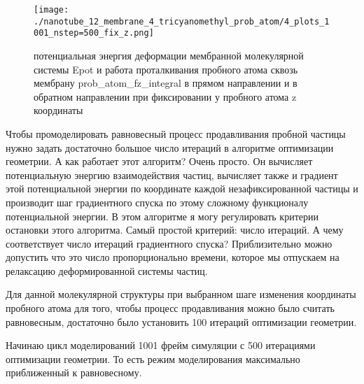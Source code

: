 \documentclass[12pt]{article}
\begin{document}
%



\begin{wrapfigure}{R}{0.7\textwidth}
    \centering
    \texttt{[image: ./nanotube\_12\_membrane\_4\_tricyanomethyl\_prob\_atom/4\_plots\_1001\_nstep=500\_fix\_z.png]}
    \caption{потенциальная энергия деформации мембранной молекулярной системы Epot и работа проталкивания пробного атома сквозь мембрану prob\_atom\_fz\_integral в прямом направлении и в обратном направлении при фиксировании у пробного атома z координаты}
    \label{fig:frame_center}
\end{wrapfigure}



Чтобы промоделировать равновесный процесс продавливания пробной частицы нужно задать достаточно большое число итераций в алгоритме оптимизации геометрии. А как работает этот алгоритм? Очень просто. Он вычисляет потенциальную энергию взаимодействия частиц, вычисляет также и градиент этой потенциальной энергии по координате каждой незафиксированной частицы и производит шаг градиентного спуска по этому сложному функционалу потенциальной энергии. В этом алгоритме я могу регулировать критерии остановки этого алгоритма. Самый простой критерий: число итераций. А чему соответствует число итераций градиентного спуска? Приблизительно можно допустить что это число пропорционально времени, которое мы отпускаем на релаксацию деформированной системы частиц.


Для данной молекулярной структуры при выбранном шаге изменения координаты пробного атома для того, чтобы процесс продавливания можно было считать равновесным, достаточно было установить 100 итераций оптимизации геометрии.

Начинаю цикл моделирований 1001 фрейм симуляции с 500 итерациями оптимизации геометрии. То есть режим моделирования максимально приближенный к равновесному.
\end{document}
